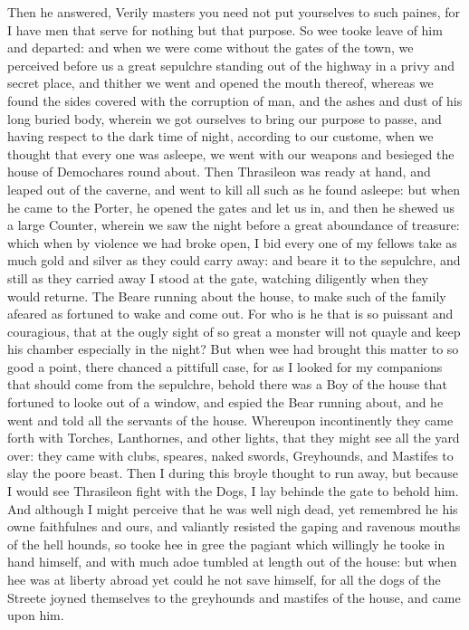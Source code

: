 Then he answered, Verily masters you need not put yourselves to such paines,
for I have men that serve for nothing but that purpose. So wee tooke leave of
him and departed: and when we were come without the gates of the town, we
perceived before us a great sepulchre standing out of the highway in a privy
and secret place, and thither we went and opened the mouth thereof, whereas we
found the sides covered with the corruption of man, and the ashes and dust of
his long buried body, wherein we got ourselves to bring our purpose to passe,
and having respect to the dark time of night, according to our custome, when we
thought that every one was asleepe, we went with our weapons and besieged the
house of Demochares round about. Then Thrasileon was ready at hand, and leaped
out of the caverne, and went to kill all such as he found asleepe: but when he
came to the Porter, he opened the gates and let us in, and then he shewed us a
large Counter, wherein we saw the night before a great aboundance of treasure:
which when by violence we had broke open, I bid every one of my fellows take as
much gold and silver as they could carry away: and beare it to the sepulchre,
and still as they carried away I stood at the gate, watching diligently when
they would returne. The Beare running about the house, to make such of the
family afeared as fortuned to wake and come out. For who is he that is so
puissant and couragious, that at the ougly sight of so great a monster will not
quayle and keep his chamber especially in the night? But when wee had brought
this matter to so good a point, there chanced a pittifull case, for as I looked
for my companions that should come from the sepulchre, behold there was a Boy
of the house that fortuned to looke out of a window, and espied the Bear
running about, and he went and told all the servants of the house. Whereupon
incontinently they came forth with Torches, Lanthornes, and other lights, that
they might see all the yard over: they came with clubs, speares, naked swords,
Greyhounds, and Mastifes to slay the poore beast. Then I during this broyle
thought to run away, but because I would see Thrasileon fight with the Dogs, I
lay behinde the gate to behold him. And although I might perceive that he was
well nigh dead, yet remembred he his owne faithfulnes and ours, and valiantly
resisted the gaping and ravenous mouths of the hell hounds, so tooke hee in
gree the pagiant which willingly he tooke in hand himself, and with much adoe
tumbled at length out of the house: but when hee was at liberty abroad yet
could he not save himself, for all the dogs of the Streete joyned themselves to
the greyhounds and mastifes of the house, and came upon him.

